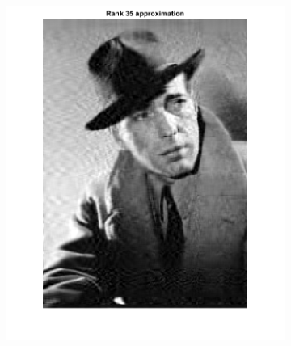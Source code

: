 \documentclass[12pt]{tehranReport}
\begin{document}
\begin{figure}[h!]
\begin{subfigure}{.55\textwidth}
			\label{fig:sub2}
		\end{subfigure}
		\begin{subfigure}{.55\textwidth}
			\centering
			\includegraphics[width=\linewidth, height=\textheight,keepaspectratio]{pics/6}
			\label{fig:sub2}
		\end{subfigure}
		\begin{subfigure}{.55\textwidth}
			\centering

\end{subfigure}
\end{figure}
\end{document}

